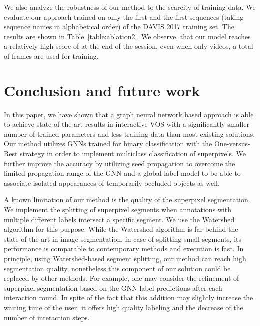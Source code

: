 \documentclass[conference]{IEEEtran}
\begin{document}
We also analyze the robustness of our method to the scarcity of training data. We evaluate our approach trained on only the first  and the first  sequences (taking sequence names in alphabetical order) of the DAVIS 2017 training set. The results are shown in Table~\ref{table:ablation2}. We observe, that our model reaches a relatively high  score of  at the end of the session, even when only  videos, a total of  frames are used for training.

\section{Conclusion and future work}

In this paper, we have shown that a graph neural network based approach is able to achieve state-of-the-art results in interactive VOS with a significantly smaller number of trained parameters and less training data than most existing solutions. Our method utilizes GNNs trained for binary classification with the One-versus-Rest strategy in order to implement multiclass classification of superpixels. We further improve the accuracy by utilizing seed propagation to overcome the limited propagation range of the GNN and a global label model to be able to associate isolated appearances of temporarily occluded objects as well.

A known limitation of our method is the quality of the superpixel segmentation. We implement the splitting of superpixel segments when annotations with multiple different labels intersect a specific segment. We use the Watershed algorithm \cite{watershed} for this purpose. While the Watershed algorithm is far behind the state-of-the-art in image segmentation, in case of splitting small segments, its performance is comparable to contemporary methods and execution is fast. In principle, using Watershed-based segment splitting, our method can reach high segmentation quality, nonetheless this component of our solution could be replaced by other methods. For example, one may consider the refinement of superpixel segmentation based on the GNN label predictions after each interaction round. In spite of the fact that this addition may slightly increase the waiting time of the user, it offers high quality labeling and the decrease of the number of interaction steps.



\end{document}
